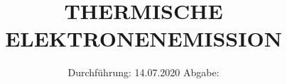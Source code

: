 

\subject{V504}
\title{THERMISCHE ELEKTRONENEMISSION}
\date{%
  Durchführung: 14.07.2020
  \hspace{3em}
  Abgabe: 
}



\maketitle
\thispagestyle{empty}
\tableofcontents
\newpage







\printbibliography{}



